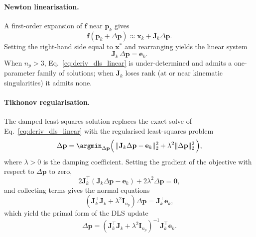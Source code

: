 \paragraph{Newton linearisation.}
A first-order expansion of $\mathbf{f}$ near $\mathbf{p}_{k}$ gives
\begin{equation}
  \mathbf{f}(\mathbf{p}_{k} + \Delta \mathbf{p}) \approx \mathbf{x}_{k} + \mathbf{J}_{k} \Delta \mathbf{p}.
\end{equation}
Setting the right-hand side equal to $\mathbf{x}^{*}$ and rearranging yields the linear system
\begin{equation}
  \mathbf{J}_{k}\, \Delta \mathbf{p} = \mathbf{e}_{k}.
  \label{eq:deriv_dls_linear}
\end{equation}
When $n_{p} > 3$, Eq.~\eqref{eq:deriv_dls_linear} is under-determined and admits a one-parameter family of solutions; when $\mathbf{J}_{k}$ loses rank (at or near kinematic singularities) it admits none.

\paragraph{Tikhonov regularisation.}
The damped least-squares solution replaces the exact solve of Eq.~\eqref{eq:deriv_dls_linear} with the regularised least-squares problem
\begin{equation}
  \Delta \mathbf{p} = \argmin_{\Delta \mathbf{p}} \Big(\, \|\mathbf{J}_{k} \Delta \mathbf{p} - \mathbf{e}_{k}\|_{2}^{2} + \lambda^{2} \|\Delta \mathbf{p}\|_{2}^{2}\, \Big),
  \label{eq:deriv_dls_objective}
\end{equation}
where $\lambda > 0$ is the damping coefficient. Setting the gradient of the objective with respect to $\Delta \mathbf{p}$ to zero,
\begin{equation}
  2 \mathbf{J}_{k}^{\top}(\mathbf{J}_{k} \Delta \mathbf{p} - \mathbf{e}_{k}) + 2 \lambda^{2} \Delta \mathbf{p} = \mathbf{0},
\end{equation}
and collecting terms gives the normal equations
\begin{equation}
  (\mathbf{J}_{k}^{\top} \mathbf{J}_{k} + \lambda^{2} \mathbf{I}_{n_{p}}) \Delta \mathbf{p} = \mathbf{J}_{k}^{\top} \mathbf{e}_{k},
\end{equation}
which yield the primal form of the DLS update
\begin{equation}
  \Delta \mathbf{p} = (\mathbf{J}_{k}^{\top} \mathbf{J}_{k} + \lambda^{2} \mathbf{I}_{n_{p}})^{-1} \mathbf{J}_{k}^{\top} \mathbf{e}_{k}.
  \label{eq:deriv_dls_primal}
\end{equation}

